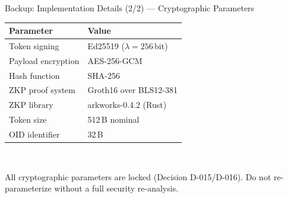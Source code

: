 \documentclass[aspectratio=169,11pt]{beamer}
\newcommand{\pinkbanner}[1]{%
  \begin{center}
  \begin{tcolorbox}[colback=fedacGray,colframe=fedacGray,
                    boxrule=0pt,arc=1mm,left=10pt,right=10pt,top=3pt,bottom=3pt,
                    width=0.96\linewidth,
                    borderline west={2pt}{0pt}{fedacTeal}]
  \footnotesize\color{fedacNavyD}#1
  \end{tcolorbox}
  \end{center}}
\begin{document}
{%
\begin{frame}[noframenumbering]{Backup: Implementation Details (2/2) — Cryptographic Parameters}
\vspace{8pt}
\centering
\scriptsize
\setlength{\tabcolsep}{12pt}
\renewcommand{\arraystretch}{1.4}
\begin{tabular}{l l}
\toprule
\rowcolor{fedacGray}\textbf{Parameter} & \textbf{Value} \\
\midrule
Token signing      & Ed25519 ($\lambda = 256$\,bit) \\
Payload encryption & AES-256-GCM \\
Hash function      & SHA-256 \\
ZKP proof system   & Groth16 over BLS12-381 \\
ZKP library        & arkworks-0.4.2 (Rust) \\
Token size         & 512\,B nominal \\
OID identifier     & 32\,B \\
\bottomrule
\end{tabular}\\[10pt]
\pinkbanner{All cryptographic parameters are locked (Decision D-015/D-016). Do not re-parameterize without a full security re-analysis.}
\end{frame}
}
\end{document}
